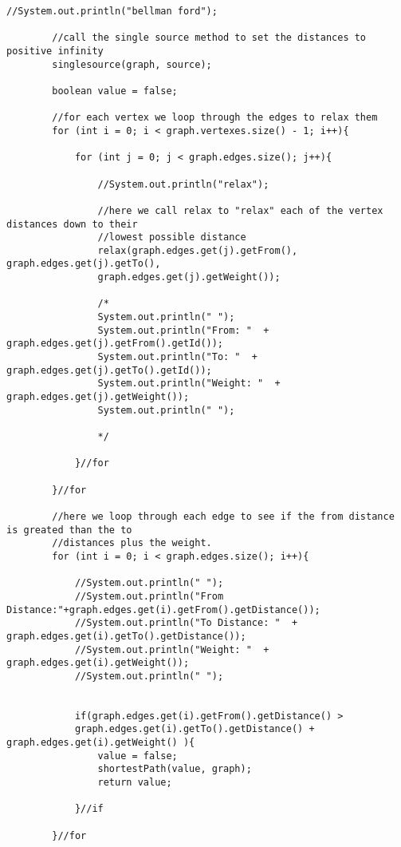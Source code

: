 \documentclass[letterpaper, 10pt,DIV=13]{scrartcl}
\numberwithin{equation}{section} %
\numberwithin{figure}{section} %
\numberwithin{table}{section} %
\begin{document}
\begin{lstlisting}[frame=single, ]
        //System.out.println("bellman ford");

        //call the single source method to set the distances to positive infinity
        singlesource(graph, source);

        boolean value = false;

        //for each vertex we loop through the edges to relax them
        for (int i = 0; i < graph.vertexes.size() - 1; i++){

            for (int j = 0; j < graph.edges.size(); j++){

                //System.out.println("relax");

                //here we call relax to "relax" each of the vertex distances down to their 
                //lowest possible distance
                relax(graph.edges.get(j).getFrom(), graph.edges.get(j).getTo(),
                graph.edges.get(j).getWeight());  
            
                /*
                System.out.println(" ");
                System.out.println("From: "  + graph.edges.get(j).getFrom().getId());
                System.out.println("To: "  + graph.edges.get(j).getTo().getId());
                System.out.println("Weight: "  + graph.edges.get(j).getWeight());
                System.out.println(" ");

                */
                
            }//for 

        }//for

        //here we loop through each edge to see if the from distance is greated than the to 
        //distances plus the weight.
        for (int i = 0; i < graph.edges.size(); i++){

            //System.out.println(" ");
            //System.out.println("From Distance:"+graph.edges.get(i).getFrom().getDistance());
            //System.out.println("To Distance: "  + graph.edges.get(i).getTo().getDistance());
            //System.out.println("Weight: "  + graph.edges.get(i).getWeight());
            //System.out.println(" ");

            
            if(graph.edges.get(i).getFrom().getDistance() >
            graph.edges.get(i).getTo().getDistance() + graph.edges.get(i).getWeight() ){
                value = false;
                shortestPath(value, graph);
                return value;
            
            }//if
            
        }//for
   

\end{lstlisting}
\end{document}
